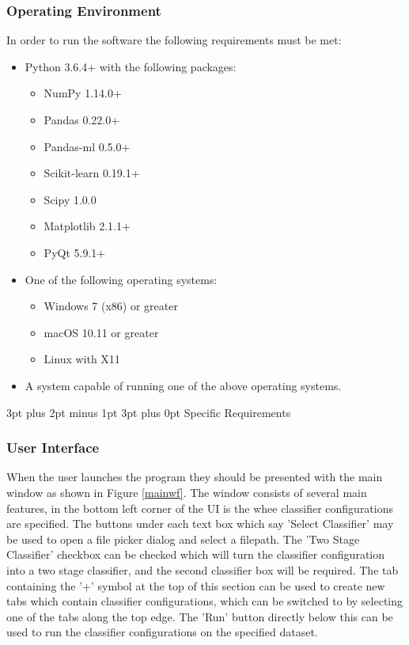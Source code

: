 \documentclass[12pt,a4paper]{article}
\makeatletter
\renewcommand\subsection{\@startsection {subsection}{1}{2mm} %
      {3pt plus 2pt minus 1pt} %
      {3pt plus 0pt} %
      {\normalfont\bfseries}}
\makeatother
\begin{document}
\subsubsection{Operating Environment}
In order to run the software the following requirements must be met:
\begin{itemize}
	\item{Python 3.6.4+ with the following packages:}
	\begin{itemize}
		\item{NumPy 1.14.0+}
		\item{Pandas 0.22.0+}
		\item{Pandas-ml 0.5.0+}
		\item{Scikit-learn 0.19.1+}
		\item{Scipy 1.0.0}
		\item{Matplotlib 2.1.1+}
		\item{PyQt 5.9.1+}
	\end{itemize}
\item{One of the following operating systems:}
	\begin{itemize}
		\item{Windows 7 (x86) or greater}
		\item{macOS 10.11 or greater}
		\item{Linux with X11}
	\end{itemize}
	\item{A system capable of running one of the above operating systems.}
\end{itemize}

\subsection{Specific Requirements}
\subsubsection{User Interface} \label{ui}
When the user launches the program they should be presented with the main window as shown in Figure \ref{mainwf}. The window consists of several main features, in the bottom left corner of the UI is the whee classifier configurations are specified. The buttons under each text box which say 'Select Classifier' may be used to open a file picker dialog and select a filepath. The 'Two Stage Classifier' checkbox can be checked which will turn the classifier configuration into a two stage classifier, and the second classifier box will be required. The tab containing the '+' symbol at the top of this section can be used to create new tabs which contain classifier configurations, which can be switched to by selecting one of the tabs along the top edge. The 'Run' button directly below this can be used to run the classifier configurations on the specified dataset.
\end{document}
